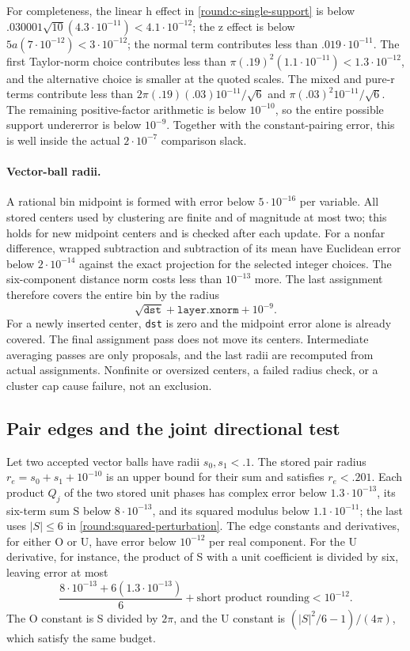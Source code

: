 For completeness, the linear h effect in
\eqref{round:c-single-support} is below
$.030001\sqrt{10}(4.3\cdot10^{-11})<4.1\cdot10^{-12}$;
the z effect is below $5a(7\cdot10^{-12})<3\cdot10^{-12}$;
the normal term contributes less than
$.019\cdot10^{-11}$.
The first Taylor-norm choice contributes less than
$\pi(.19)^2(1.1\cdot10^{-11})<1.3\cdot10^{-12}$,
and the alternative choice is smaller at the quoted scales.
The mixed and pure-r terms contribute less than
$2\pi(.19)(.03)10^{-11}/\sqrt6$ and
$\pi(.03)^2 10^{-11}/\sqrt6$.
The remaining positive-factor arithmetic is below $10^{-10}$,
so the entire possible support undererror is below $10^{-9}$.
Together with the constant-pairing error, this is well inside
the actual $2\cdot10^{-7}$ comparison slack.

\paragraph{Vector-ball radii.}
A rational bin midpoint is formed with error below
$5\cdot10^{-16}$ per variable.
All stored centers used by clustering are finite and of magnitude
at most two; this holds for new midpoint centers and is checked
after each update.
For a nonfar difference, wrapped subtraction and subtraction of
its mean have Euclidean error below $2\cdot10^{-14}$ against the
exact projection for the selected integer choices.
The six-component distance norm costs less than $10^{-13}$ more.
The last assignment therefore covers the entire bin by the radius
\[
 \sqrt{\mathtt{dst}}+\mathtt{layer.xnorm}+10^{-9}.
\]
For a newly inserted center, \texttt{dst} is zero and the midpoint
error alone is already covered.
The final assignment pass does not move its centers.
Intermediate averaging passes are only proposals, and the last
radii are recomputed from actual assignments.
Nonfinite or oversized centers, a failed radius check, or a cluster
cap cause failure, not an exclusion.

\subsection{Pair edges and the joint directional test}
\label{round:joint}

Let two accepted vector balls have radii $s_0,s_1<.1$.
The stored pair radius $r_e=s_0+s_1+10^{-10}$ is an upper bound
for their sum and satisfies $r_e<.201$.
Each product $Q_j$ of the two stored unit phases has complex error
below $1.3\cdot10^{-13}$, its six-term sum S below
$8\cdot10^{-13}$, and its squared modulus below
$1.1\cdot10^{-11}$; the last uses $|S|\le6$ in
\eqref{round:squared-perturbation}.
The edge constants and derivatives, for either O or U, have error
below $10^{-12}$ per real component.
For the U derivative, for instance, the product of S with a unit
coefficient is divided by six, leaving error at most
\[
 \frac{8\cdot10^{-13}+6(1.3\cdot10^{-13})}{6}
       +\text{short product rounding}<10^{-12}.
\]
The O constant is S divided by $2\pi$, and the U constant is
$(|S|^2/6-1)/(4\pi)$, which satisfy the same budget.

